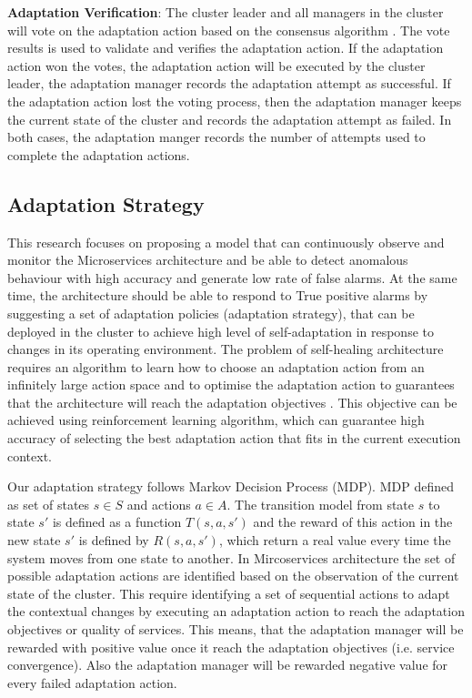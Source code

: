 \documentclass{ieeeaccess}
\begin{document}
\textbf{Adaptation Verification}: The cluster leader and all managers in the cluster will vote on the adaptation action based on the consensus algorithm \cite{ongaro2015raft}. The vote results is used to validate and verifies the adaptation action. If the adaptation action won the votes, the adaptation action will be executed by the cluster leader, the adaptation manager records the adaptation attempt as successful. If the adaptation action lost the voting process, then the adaptation manager keeps the current state of the cluster and records the adaptation attempt as failed. In both cases, the adaptation manger records the number of attempts used to complete the adaptation actions.   
 



\subsection{Adaptation Strategy}
\label{sec:mapk}
This research focuses on proposing a model that can continuously observe and monitor the Microservices architecture and be able to detect anomalous behaviour with high accuracy and generate low rate of false alarms. At the same time, the architecture should be able to respond to True positive alarms by suggesting a set of adaptation policies (adaptation strategy), that can be deployed in the cluster to achieve high level of self-adaptation in response to changes in its operating environment. The problem of self-healing architecture requires an algorithm to learn how to choose an adaptation action from an infinitely large action space and to optimise the adaptation action to guarantees that the architecture will reach the adaptation objectives \cite{van2012reinforcement}. This objective can be achieved using reinforcement learning algorithm, which can guarantee high accuracy of selecting the best adaptation action that fits in the current execution context. 

Our adaptation strategy follows Markov Decision Process (MDP). MDP defined as set of states $s \in S$ and actions $a \in A$.  The transition model from  state $s$ to state $s'$ is defined as a function $T(s,a,s')$ and the reward of this action in the new state $s'$ is defined by $R(s,a,s')$, which return a real value every time the system moves from one state to another. In Mircoservices architecture the set of possible adaptation actions are identified based on the observation of the current state of the cluster. This require identifying a set of sequential actions to adapt the contextual changes by executing an adaptation action to reach the adaptation objectives or quality of services.  This means, that the adaptation manager will be rewarded with positive value once it reach the adaptation objectives (i.e. service convergence). Also the adaptation manager will be rewarded  negative value for every failed adaptation action. 
\end{document}
